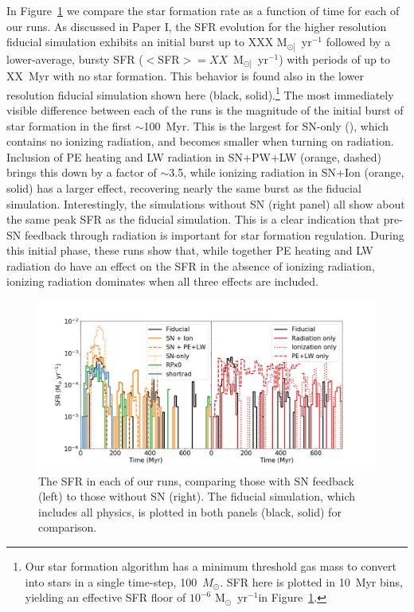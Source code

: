 \documentclass[twocolumn]{aastex62}
\newcommand{\methodpaper}{Paper I}
\newcommand{\fiducialstyle}{black, solid}
\newcommand{\snionstyle}{orange, solid}
\newcommand{\snpelwstyle}{orange, dashed}
\newcommand{\sfrunits}{M$_{\odot}$~yr$^{-1}$}
\begin{document}
In Figure~\ref{fig:SFR} we compare the star formation rate as a function of time for each of our runs. As discussed in \methodpaper, the SFR evolution for the higher resolution fiducial simulation exhibits an initial burst up to XXX M$_{\odot]}$~yr$^{-1}$ followed by a lower-average, bursty SFR ($<$SFR$> = XX$~M$_{\odot]}$~yr$^{-1}$) with periods of up to XX~Myr with no star formation. This behavior is found also in the lower resolution fiducial simulation shown here (\fiducialstyle).\footnote{Our star formation algorithm has a minimum threshold gas mass to convert into stars in a single time-step, 100~$M_{\odot}$. SFR here is plotted in 10~Myr bins, yielding an effective SFR floor of $10^{-6}$ \sfrunits in Figure~\ref{fig:SFR}.} The most immediately visible difference between each of the runs is the magnitude of the initial burst of star formation in the first $\sim$100~Myr. This is the largest for SN-only (\snstyle), which contains no ionizing radiation, and becomes smaller when turning on radiation. Inclusion of PE heating and LW radiation in SN+PW+LW (\snpelwstyle) brings this down by a factor of $\sim$3.5, while ionizing radiation in SN+Ion (\snionstyle) has a larger effect, recovering nearly the same burst as the fiducial simulation. Interestingly, the simulations without SN (right panel) all show about the same peak SFR as the fiducial simulation. This is a clear indication that pre-SN feedback through radiation is important for star formation regulation. During this initial phase, these runs show that, while together PE heating and LW radiation do have an effect on the SFR in the absence of ionizing radiation, ionizing radiation dominates when all three effects are included.

\begin{figure}
  \centering
  \includegraphics[width=0.98\linewidth]{figures/physics_comparison_sfr_2}
  \caption{The SFR in each of our runs, comparing those with SN feedback (left) to those without SN (right). The fiducial simulation, which includes all physics, is plotted in both panels (\fiducialstyle) for comparison.}
  \label{fig:SFR}
\end{figure}
\end{document}
